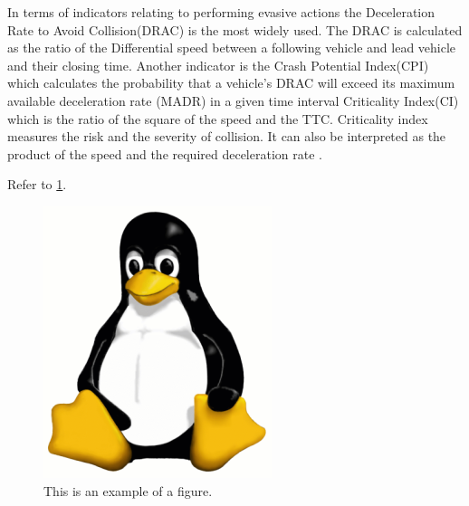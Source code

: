 In terms of  indicators relating to  performing evasive actions the Deceleration Rate to Avoid Collision(DRAC) is the most widely used. The DRAC is calculated as  the ratio of the Differential speed between a following vehicle and lead vehicle   and their closing time\autocite{almqvist1991use,mahmud2017application}. Another indicator is the Crash Potential Index(CPI) which calculates the probability that a vehicle's DRAC will exceed its maximum available deceleration rate (MADR) in a given time interval\autocite{cunto2009simulated} Criticality Index(CI) which is the ratio of the square of the speed and the TTC.  Criticality index measures the risk and the severity of collision. It can also be interpreted as the product of the speed and the required deceleration rate \autocite{chan2006defining}.

Refer to \cref{fig:tux}.

\begin{figure}
    \centering
    \includegraphics{figs/tux.png}
    \caption{This is an example of a figure.}
    \label{fig:tux}
\end{figure}
